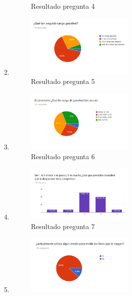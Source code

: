 \begin{enumerate}
\begin{figure}[H]
	\caption{Resultado pregunta 4}
\end{figure}
\item \begin{figure}[H]
	\centering
	\includegraphics[width=0.5\textwidth]{Apendice2/img/FrecuenciaGasolina}
	\caption{Resultado pregunta 5}
\end{figure}
\item \begin{figure}[H]
	\centering
	\includegraphics[width=0.5\textwidth]{Apendice2/img/CargaGasolina}
	\caption{Resultado pregunta 6}
\end{figure}
\item \begin{figure}[H]
	\centering
	\includegraphics[width=0.5\textwidth]{Apendice2/img/Precision}
	\caption{Resultado pregunta 7}
\end{figure}
\item \begin{figure}[H]
	\centering
	\includegraphics[width=0.5\textwidth]{Apendice2/img/Metodo}

\end{figure}
\end{enumerate}
